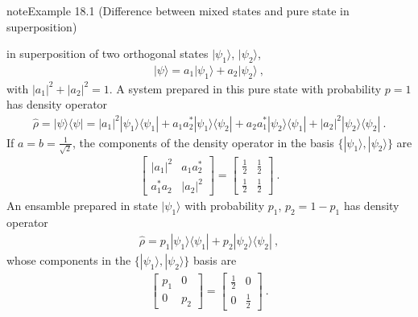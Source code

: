 \documentclass[letterpaper,10pt,english]{jupyterBook}
\begin{document}
\label{ch/quantum-mechanics/density-operator:example-0}
\begin{sphinxadmonition}{note}{Example 18.1 (Difference between mixed states and pure state in superposition)}



\sphinxAtStartPar
{} in superposition of two orthogonal states \(| \psi_1 \rangle\), \(| \psi_2 \rangle\),
\begin{equation*}
\begin{split}| \psi \rangle = a_1 | \psi_1 \rangle + a_2 | \psi_2 \rangle \ ,\end{split}
\end{equation*}
\sphinxAtStartPar
with \(|a_1|^2 + |a_2|^2 = 1\). A system prepared in this pure state with probability \(p = 1\) has density operator
\begin{equation*}
\begin{split}\hat{\rho} = | \psi \rangle \langle \psi | = |a_1|^2 | \psi_1 \rangle \langle \psi_1 | + a_1 a_2^* | \psi_1 \rangle \langle \psi_2 | + a_2 a_1^* | \psi_2 \rangle \langle \psi_1 | + |a_2|^2 | \psi_2 \rangle \langle \psi_2 | \ . \end{split}
\end{equation*}
\sphinxAtStartPar
If \(a = b = \frac{1}{\sqrt{2}}\), the components of the density operator in the basis \(\{ | \psi_1 \rangle, | \psi_2 \rangle \}\) are
\begin{equation*}
\begin{split}
\begin{bmatrix} |a_1|^2 & a_1 a_2^* \\ a_1^* a_2 & |a_2|^2 \end{bmatrix} =
\begin{bmatrix} \frac{1}{2} & \frac{1}{2} \\ \frac{1}{2} & \frac{1}{2} \end{bmatrix} \ .
\end{split}
\end{equation*}
\sphinxAtStartPar
{} An ensamble prepared in state \(| \psi_1 \rangle\) with probability \(p_1\), \(p_2 = 1 - p_1\) has density operator
\begin{equation*}
\begin{split}\hat{\rho} = p_1 | \psi_1 \rangle \langle \psi_1 | + p_2 | \psi_2 \rangle \langle \psi_2 | \ ,\end{split}
\end{equation*}
\sphinxAtStartPar
whose components in the \(\{ | \psi_1 \rangle, | \psi_2 \rangle \}\) basis are
\begin{equation*}
\begin{split}
\begin{bmatrix} p_1 & 0 \\ 0 & p_2 \end{bmatrix} =
\begin{bmatrix} \frac{1}{2} & 0 \\ 0 & \frac{1}{2} \end{bmatrix}
\ .\end{split}
\end{equation*}\end{sphinxadmonition}
\end{document}
